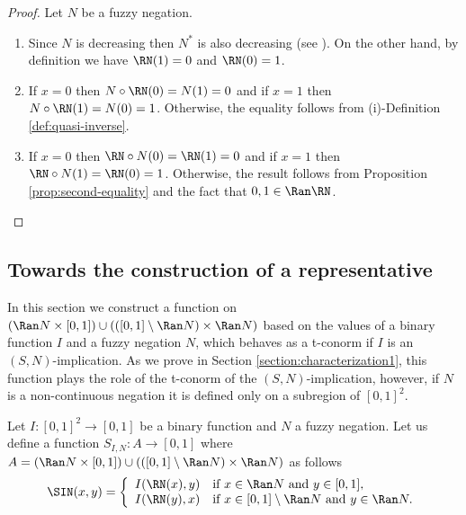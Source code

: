 \begin{proof} Let $N$ be a fuzzy negation.
	\begin{enumerate}[label=(\roman*)]
		\item Since $N$ is decreasing then $N^*$ is also decreasing (see \cite{Klement1999}). On the other hand, by definition we have $\RN(1)=0$ and $\RN(0)=1$.
		\item If $x=0$ then $N \circ \RN(0)=N(1)=0$ and if $x=1$ then $N \circ \RN(1)=N(0)=1$. Otherwise, the equality follows from (i)-Definition \ref{def:quasi-inverse}.
		\item If $x=0$ then $\RN \circ N(0)=\RN(1)=0$ and if $x=1$ then $\RN \circ N(1)=\RN(0)=1$. Otherwise, the result follows from Proposition \ref{prop:second-equality} and the fact that $0,1 \in \Ran \RN$.
	\end{enumerate}
\end{proof}

\subsection{Towards the construction of a representative}\label{subsection:representative}

In this section we construct a function on $(\Ran N \times [0,1]) \cup (([0,1] \setminus \Ran N) \times \Ran N)$ based on the values of a binary function $I$ and a fuzzy negation $N$, which behaves as a t-conorm if $I$ is an $(S,N)$-implication. As we prove in Section \ref{section:characterization1}, this function plays the role of the t-conorm of the $(S,N)$-implication, however, if $N$ is a non-continuous negation it is defined only on a subregion of $[0,1]^2$.

\begin{definition}\label{def:SIN}
Let $I:[0,1]^2 \to [0,1]$ be a binary function and $N$ a fuzzy negation. Let us define a function $S_{I,N}:A \to [0,1]$ where $A= (\Ran N \times [0,1]) \cup (([0,1] \setminus \Ran N) \times \Ran N)$ as follows
	\begin{equation}\label{eq:SIN}
		\SIN(x,y)
		=
		\left\{ \begin{array}{ll}
			I(\RN(x),y) &   \text{if }   x \in \Ran N \text{ and } y \in [0,1], \\
			I(\RN(y),x) & \text{if } x \in [0,1] \setminus \Ran N \text{ and } y \in \Ran N.
		\end{array} \right.
	\end{equation}
\end{definition}

